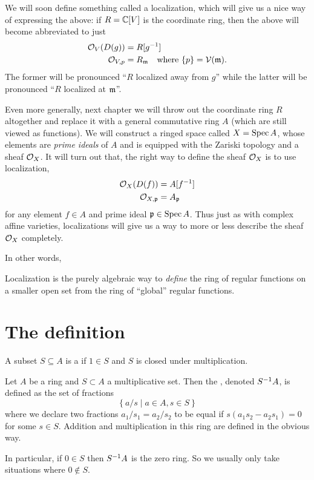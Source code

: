 We will soon define something called a localization,
which will give us a nice way of expressing the above:
if $R = \mathbb C[V]$ is the coordinate ring, then
the above will become abbreviated to just
\begin{align*}
	\mathcal O_{V}(D(g)) &= R[g^{-1}] \\
	\mathcal O_{V, p} &= R_{\mathfrak m} \quad \text{where } \{p\} = \mathcal V(\mathfrak m).
\end{align*}
The former will be pronounced
``$R$ localized away from $g$''
while the latter will be pronounced
``$R$ localized at $\mathfrak m$''.

Even more generally,
next chapter we will throw out the coordinate ring $R$
altogether and replace it with a general commutative ring $A$
(which are still viewed as functions).
We will construct a ringed space called $X = \operatorname{Spec} A$,
whose elements are \emph{prime ideals} of $A$
and is equipped with the Zariski topology and a sheaf $\mathcal O_X$.
It will turn out that, the right way to define the sheaf $\mathcal O_X$ is to use localization,
\begin{align*}
	\mathcal O_X(D(f)) &= A[f^{-1}] \\
	\mathcal O_{X,\mathfrak p} &= A_\mathfrak p
\end{align*}
for any element $f \in A$ and prime ideal $\mathfrak p \in \operatorname{Spec} A$.
Thus just as with complex affine varieties,
localizations will give us a way to more or less
describe the sheaf $\mathcal O_X$ completely.

In other words,
\begin{moral}
	Localization is the purely algebraic way to \emph{define} the
	ring of regular functions on a smaller open set from the ring of ``global''
	regular functions.
\end{moral}

\section{The definition}
\begin{definition}
	A subset $S \subseteq A$ is a 
	if $1 \in S$ and $S$ is closed under multiplication.
\end{definition}
\begin{definition}
	Let $A$ be a ring and $S \subset A$ a multiplicative set.
	Then the , denoted $S^{-1} A$,
	is defined as the set of fractions
	\[ \left\{ a/s \mid a \in A, s \in S \right\} \]
	where we declare two fractions $a_1 / s_1 = a_2 / s_2$
	to be equal if $s(a_1s_2 - a_2s_1) = 0$ for some $s \in S$.
	Addition and multiplication in this ring
	are defined in the obvious way.
\end{definition}
In particular, if $0 \in S$ then $S^{-1} A$ is the zero ring.
So we usually only take situations where $0 \notin S$.

